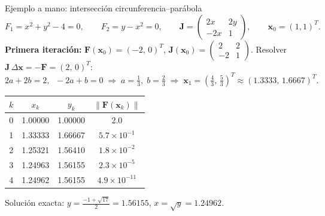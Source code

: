 \documentclass[aspectratio=169,11pt]{beamer}
\newcommand{\vect}[1]{\mathbf{#1}}
\newcommand{\Jac}{\mathbf{J}}
\begin{document}
\begin{frame}{Ejemplo a mano: intersección circunferencia--parábola}
  \small
  \[
    F_1=x^2+y^2-4=0,\qquad F_2=y-x^2=0,\qquad
    \Jac=\begin{pmatrix}2x&2y\\-2x&1\end{pmatrix},\qquad \vect x_0=(1,1)^T.
  \]
  \textbf{Primera iteración:} $\vect F(\vect x_0)=(-2,\,0)^T$, \; $\Jac(\vect x_0)=\begin{pmatrix}2&2\\-2&1\end{pmatrix}$. Resolver $\Jac\,\Delta\vect x=-\vect F=(2,\,0)^T$:
  \[
    2a+2b=2,\;\; -2a+b=0 \;\Rightarrow\; a=\tfrac13,\; b=\tfrac23
    \;\Rightarrow\; \vect x_1=\left(\tfrac43,\,\tfrac53\right)^T\approx(1.3333,\,1.6667)^T.
  \]
  \begin{center}
  \footnotesize
  \begin{tabular}{@{}cccc@{}}
    \toprule
    $k$ & $x_k$ & $y_k$ & $\|\vect F(\vect x_k)\|$ \\
    \midrule
    0 & 1.00000 & 1.00000 & 2.0 \\
    1 & 1.33333 & 1.66667 & $5.7\times10^{-1}$ \\
    2 & 1.25321 & 1.56410 & $1.8\times10^{-2}$ \\
    3 & 1.24963 & 1.56155 & $2.3\times10^{-5}$ \\
    4 & 1.24962 & 1.56155 & $4.9\times10^{-11}$ \\
    \bottomrule
  \end{tabular}
  \end{center}
  {\small Solución exacta: $y=\frac{-1+\sqrt{17}}{2}=1.56155$, \; $x=\sqrt y=1.24962$.}
\end{frame}
\end{document}
